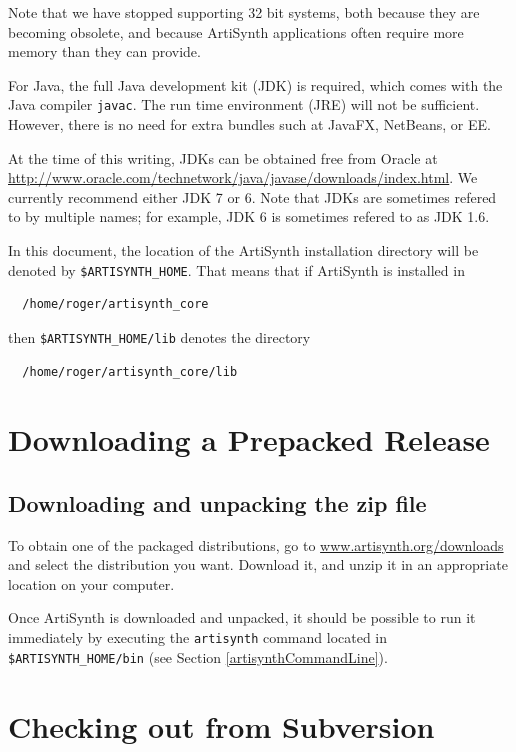 \documentclass{article}
\def\SEP{/}
\def\directory{directory }
\begin{document}
Note that we have stopped supporting 32 bit systems, both because they
are becoming obsolete, and because ArtiSynth applications often
require more memory than they can provide.

For Java, the full Java development kit (JDK) is required, which comes
with the Java compiler {\tt javac}. The run time environment (JRE)
will not be sufficient. However, there is no need for extra bundles
such at JavaFX, NetBeans, or EE.

At the time of this writing, JDKs can be obtained free from Oracle at
\href{http://www.oracle.com/technetwork/java/javase/downloads/index.html}
{http://www.oracle.com/technetwork/java/javase/downloads/index.html}.
We currently recommend either JDK 7 or 6. Note that JDKs are sometimes
refered to by multiple names; for example, JDK 6 is sometimes refered
to as JDK 1.6.

In this document, the location of the ArtiSynth installation \directory
will be denoted by {\tt \$ARTISYNTH\_HOME}.  That
means that if ArtiSynth is installed in
\begin{verbatim}
  /home/roger/artisynth_core
\end{verbatim}
then {\tt \$ARTISYNTH\_HOME\SEP lib} denotes the \directory
\begin{verbatim}
  /home/roger/artisynth_core/lib
\end{verbatim}

\section{Downloading a Prepacked Release}
\label{PrepackagedRelease}

\subsection{Downloading and unpacking the zip file}

To obtain one of the packaged distributions, go to
\href{http://www.artisynth.org/downloads} 
{www.artisynth.org/downloads}
and select the distribution
you want. Download it, and unzip it in an appropriate location on your
computer.

Once ArtiSynth is downloaded and unpacked, it should be possible to
run it immediately by executing the {\tt artisynth} command located
in {\tt \$ARTISYNTH\_HOME\SEP bin} (see Section \ref{artisynthCommandLine}).

\section{Checking out from Subversion}
\label{SubversionCheckout}
\end{document}
